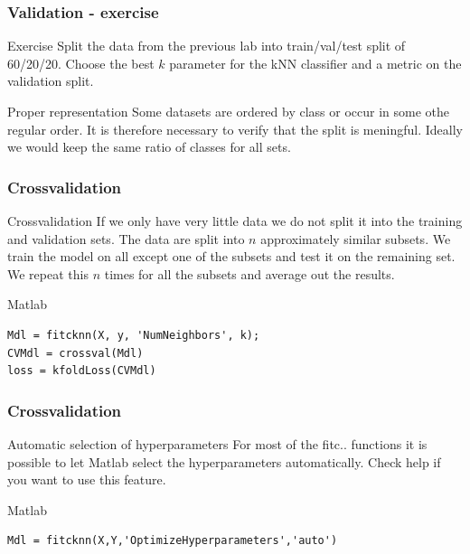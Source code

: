 \documentclass{beamer}
\begin{document}
\begin{frame}
\frametitle{Validation - exercise}
\begin{block}{Exercise}
Split the data from the previous lab into train/val/test split of 60/20/20. Choose the best $k$ parameter for the kNN classifier and a metric on the validation split.
\end{block}

\begin{block}{Proper representation}
Some datasets are ordered by class or occur in some othe regular order. It is therefore necessary to verify that the split is meningful. Ideally we would keep the same ratio of classes for all sets.
\end{block}
\end{frame}

\begin{frame}[fragile]
\frametitle{Crossvalidation}
\begin{block}{Crossvalidation}
If we only have very little data we do not split it into the training and validation sets. The data are split into $n$ approximately similar subsets. We train the model on all except one of the subsets and test it on the remaining set. We repeat this $n$ times for all the subsets and average out the results.
\end{block}

\begin{block}{Matlab}
\begin{verbatim}
Mdl = fitcknn(X, y, 'NumNeighbors', k);
CVMdl = crossval(Mdl)
loss = kfoldLoss(CVMdl) \end{verbatim}
\end{block}
\end{frame}



\begin{frame}[fragile]
\frametitle{Crossvalidation}
\begin{block}{Automatic selection of hyperparameters}
For most of the fitc.. functions it is possible to let Matlab select the hyperparameters automatically. Check help if you want to use this feature.
\end{block}

\begin{block}{Matlab}
\begin{verbatim}
Mdl = fitcknn(X,Y,'OptimizeHyperparameters','auto')\end{verbatim}
\end{block}
\end{frame}
\end{document}
